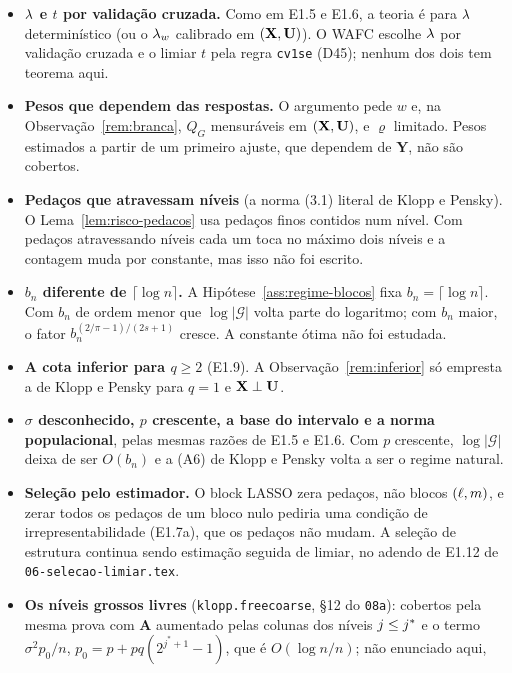 \documentclass[11pt,a4paper]{article}
\newcommand{\Amat}{\mathbf{A}}
\newcommand{\bY}{\mathbf{Y}}
\newcommand{\Gcal}{\mathcal{G}}
\newcommand{\bn}{b_{n}}
\newcommand{\jst}{j^{*}}
\begin{document}
\begin{itemize}[nosep, leftmargin=*]
  \item \textbf{$\lambda$ e $t$ por validação cruzada.} Como em E1.5 e E1.6, a
    teoria é para $\lambda$ determinístico (ou o $\lambda_{w}$ calibrado em
    $(\mathbf{X},\mathbf{U})$). O WAFC escolhe $\lambda$ por validação cruzada e o limiar $t$
    pela regra \texttt{cv1se} (D45); nenhum dos dois tem teorema aqui.
  \item \textbf{Pesos que dependem das respostas.} O argumento pede $w$ e, na
    Observação~\ref{rem:branca}, $Q_{G}$ mensuráveis em $(\mathbf{X},\mathbf{U})$, e
    $\varrho$ limitado. Pesos estimados a partir de um primeiro ajuste, que
    dependem de $\bY$, não são cobertos.
  \item \textbf{Pedaços que atravessam níveis} (a norma (3.1) literal de Klopp
    e Pensky). O Lema~\ref{lem:risco-pedacos} usa pedaços finos contidos num
    nível. Com pedaços atravessando níveis cada um toca no máximo dois níveis e
    a contagem muda por constante, mas isso não foi escrito.
  \item \textbf{$\bn$ diferente de $\lceil\log n\rceil$.} A
    Hipótese~\ref{ass:regime-blocos} fixa $\bn = \lceil\log n\rceil$. Com
    $\bn$ de ordem menor que $\log|\Gcal|$ volta parte do logaritmo; com
    $\bn$ maior, o fator $\bn^{(2/\pi-1)/(2s+1)}$ cresce. A constante ótima
    não foi estudada.
  \item \textbf{A cota inferior para $q \ge 2$} (E1.9). A
    Observação~\ref{rem:inferior} só empresta a de Klopp e Pensky para
    $q = 1$ e $\mathbf{X}\perp\mathbf{U}$.
  \item \textbf{$\sigma$ desconhecido, $p$ crescente, a base do intervalo e a
    norma populacional}, pelas mesmas razões de E1.5 e E1.6. Com $p$
    crescente, $\log|\Gcal|$ deixa de ser $O(\bn)$ e a (A6) de Klopp e Pensky
    volta a ser o regime natural.
  \item \textbf{Seleção pelo estimador.} O block LASSO zera pedaços, não
    blocos $(\ell,m)$, e zerar todos os pedaços de um bloco nulo pediria uma
    condição de irrepresentabilidade (E1.7a), que os pedaços não mudam. A
    seleção de estrutura continua sendo estimação seguida de limiar, no
    adendo de E1.12 de \texttt{06-selecao-limiar.tex}.
  \item \textbf{Os níveis grossos livres} (\texttt{klopp.freecoarse}, §12 do
    \texttt{08a}): cobertos pela mesma prova com $\Amat$ aumentado pelas
    colunas dos níveis $\lev \le \jst$ e o termo $\sigma^{2}p_{0}/n$,
    $p_{0} = p + pq(2^{\jst+1}-1)$, que é $O(\log n/n)$; não enunciado aqui,

\end{itemize}
\end{document}
